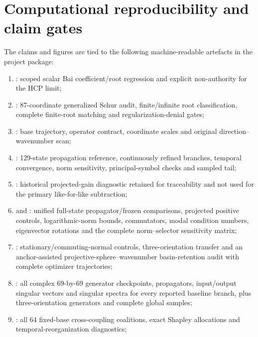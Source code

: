 \section{Computational reproducibility and claim gates}
\label{app:dynamic_reproducibility}

The claims and figures are tied to the following machine-readable artefacts in the project package:
\begin{enumerate}
\item {}: scoped scalar Bai coefficient/root regression and explicit non-authority for the HCP limit;
\item {}: 87-coordinate generalized Schur audit, finite/infinite root classification, complete finite-root matching and regularization-denial gates;
\item {}: base trajectory, operator contract, coordinate scales and original direction--wavenumber scan;
\item {}: 129-state propagation reference, continuously refined branches, temporal convergence, norm sensitivity, principal-symbol checks and sampled tail;
\item {}: historical projected-gain diagnostic retained for traceability and not used for the primary like-for-like subtraction;
\item {} and : unified full-state propagator/frozen comparisons, projected positive controls, logarithmic-norm bounds, commutators, modal condition numbers, eigenvector rotations and the complete norm--selector sensitivity matrix;
\item {}: stationary/commuting-normal controls, three-orientation transfer and an anchor-assisted projective-sphere--wavenumber basin-retention audit with complete optimizer trajectories;
\item {}: all complex 69-by-69 generator checkpoints, propagators, input/output singular vectors and singular spectra for every reported baseline branch, plus three-orientation generators and complete global samples;
\item {}: all 64 fixed-base cross-coupling coalitions, exact Shapley allocations and temporal-reorganization diagnostics;

\end{enumerate}
